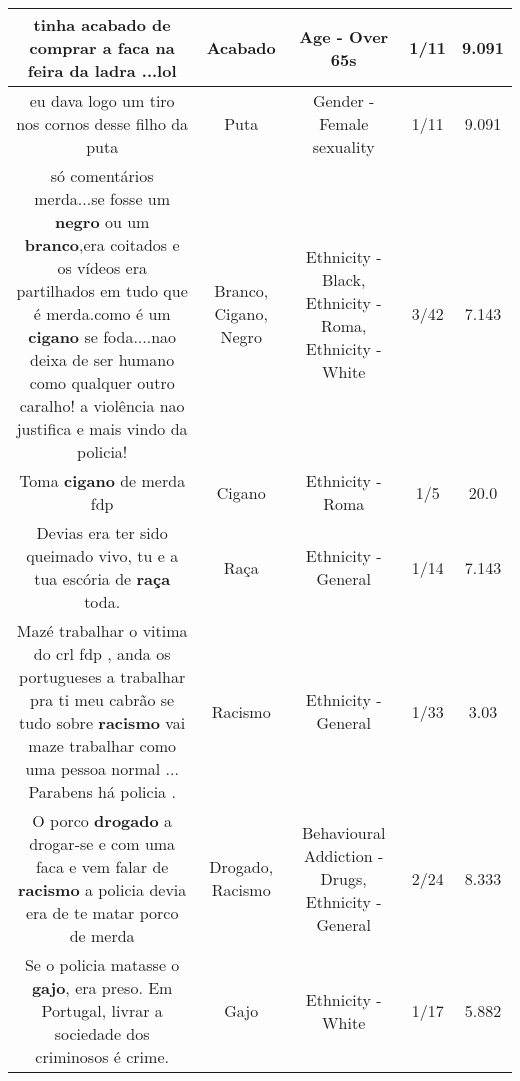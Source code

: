 \documentclass[11pt]{article}
\newlength\mylength
\begin{document}
\begin{center}
\begin{longtable}{|C{.65\mylength}|C{.30\mylength}|C{.12\mylength}|C{.12\mylength}|C{.12\mylength}|}
  \small tinha \textbf{acabado} de comprar a faca na feira da ladra ...lol\normalsize   & Acabado & Age - Over 65s & 1/11 & 9.091 \\  \hline
  \small eu dava logo um tiro nos cornos desse filho da puta\normalsize   & Puta & Gender - Female sexuality & 1/11 & 9.091 \\  \hline
  \small só comentários merda...se fosse um \textbf{negro} ou um \textbf{branco},era coitados e os vídeos era partilhados em tudo que é merda.como é um \textbf{cigano} se foda....nao deixa de ser humano como qualquer outro caralho! a violência nao justifica e mais vindo da policia!\normalsize   & Branco, Cigano, Negro & Ethnicity - Black, Ethnicity - Roma, Ethnicity - White & 3/42 & 7.143 \\  \hline
  \small Toma \textbf{cigano} de merda fdp\normalsize   & Cigano & Ethnicity - Roma & 1/5 & 20.0 \\  \hline
  \small Devias era ter sido queimado vivo, tu e a tua escória de \textbf{raça} toda.\normalsize   & Raça & Ethnicity - General & 1/14 & 7.143 \\  \hline
  \small Mazé trabalhar o vitima do crl fdp , anda os portugueses a trabalhar pra ti meu cabrão se tudo sobre \textbf{racismo} vai maze trabalhar como uma pessoa normal ... Parabens há policia .\normalsize   & Racismo & Ethnicity - General & 1/33 & 3.03 \\  \hline
  \small O porco \textbf{drogado} a drogar-se e com uma faca e vem falar de \textbf{racismo} a policia devia era de te matar porco de merda\normalsize   & Drogado, Racismo & Behavioural Addiction - Drugs, Ethnicity - General & 2/24 & 8.333 \\  \hline
  \small Se o policia matasse o \textbf{gajo}, era preso. Em Portugal, livrar a sociedade dos criminosos é crime.\normalsize   & Gajo & Ethnicity - White & 1/17 & 5.882 \\  \hline

\end{longtable}
\end{center}
\end{document}
